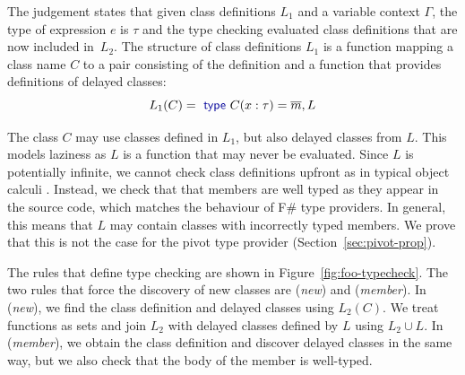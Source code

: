 \documentclass[a4paper,UKenglish]{lipics-v2016}
\theoremstyle{plain}
\theoremstyle{definition}
\newcommand{\kvd}[1]{\textnormal{\textcolor{kvdclr}{\sffamily #1}}}
\begin{document}
\noindent
The judgement states that given class definitions $L_1$ and a variable context $\Gamma$, the type
of expression $e$ is $\tau$ and the type checking evaluated class definitions that are
now included in~$L_2$. The structure of class definitions $L_1$ is a function mapping a class name 
$C$ to a pair consisting of the definition and a function that provides definitions of 
delayed classes: 
%
\begin{equation*}
L_1(C) = \kvd{type}~C(x:\tau) = \overline{m}, L
\end{equation*}

\noindent
The class $C$ may use classes defined in $L_1$, but also delayed classes from $L$. This models 
laziness as $L$ is a function that may never be evaluated. Since $L$ is potentially infinite, we 
cannot check class definitions upfront as in typical object calculi \cite{objects}. Instead, we check that 
that members are well typed as they appear in the source code, which matches the behaviour of F\# 
type providers. In general, this means that $L$ may contain classes with incorrectly typed 
members. We prove that this is not the case for the pivot type provider (Section~\ref{sec:pivot-prop}).

The rules that define type checking are shown in Figure~\ref{fig:foo-typecheck}. The two rules
that force the discovery of new classes are (\emph{new}) and (\emph{member}). In (\emph{new}), we
find the class definition and delayed classes using $L_2(C)$. We treat functions as sets and 
join $L_2$ with delayed classes defined by $L$ using $L_2 \cup L$. In (\emph{member}), we obtain
the class definition and discover delayed classes in the same way, but we also check that the body
of the member is well-typed.

\end{document}

